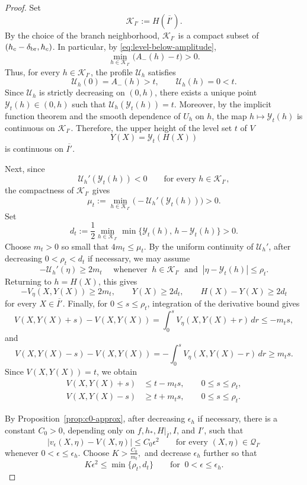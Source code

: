 \documentclass[reqno,12pt]{amsart}
\numberwithin{equation}{section}
\theoremstyle{remark}
\begin{document}
\begin{proof}
Set
$$
\mathcal K_{I'}:=H(\overline{I'}).
$$
By the choice of the branch neighborhood, $\mathcal K_{I'}$ is a compact subset
of $(h_c-\delta_{\rm br},h_c)$. In particular, by
\eqref{eq:level-below-amplitude},
$$
\min_{h\in\mathcal K_{I'}}\bigl(A_-(h)-t\bigr)>0.
$$
Thus, for every $h\in\mathcal K_{I'}$, the profile $\mathcal U_h$ satisfies
$$
\mathcal U_h(0)=A_-(h)>t, \qquad \mathcal U_h(h)=0<t.
$$
Since $\mathcal  U_h$ is strictly decreasing on $(0,h)$, there exists a unique point $\mathcal Y_t(h)\in(0,h)$ such that $\mathcal U_h(\mathcal Y_t(h))=t.$
Moreover, by the implicit function theorem and the smooth dependence of
$U_h$ on $h$, the map $h\mapsto \mathcal Y_t(h)$ is continuous on
$\mathcal K_{I'}$. Therefore, the upper height of the level set $t$ of $V$ 
$$Y(X)=\mathcal Y_t(H(X))$$ 
is continuous on $\overline{I'}$.

Next, since
$$
\mathcal U_h'(\mathcal  Y_t(h))<0
\qquad\text{for every }h\in\mathcal K_{I'},
$$
the compactness of $\mathcal K_{I'}$ gives
$$
\mu_t:= \min_{h\in\mathcal K_{I'}} \bigl(-\mathcal U_h'(\mathcal Y_t(h))\bigr)>0.
$$
Set
$$
d_t:=\frac12
\min_{h\in\mathcal K_{I'}}
\min\{\mathcal Y_t(h),\,h-\mathcal Y_t(h)\}>0.
$$
Choose $m_t>0$ so small that $4m_t\le \mu_t$. 
By the uniform continuity of
$\mathcal U_h'$, after decreasing $0<\rho_t<d_t$ if necessary, we may assume
$$
   -\mathcal U_h'(\eta)\ge 2m_t \quad \text{ 
whenever } \ h\in\mathcal K_{I'} \ \text{ and } \ |\eta-\mathcal Y_t(h)|\le \rho_t.
$$
Returning to $h=H(X)$, this gives
$$
-V_\eta(X,Y(X))\ge 2m_t, \qquad  Y(X)\ge 2d_t,  \qquad
H(X)-Y(X)\ge 2d_t
$$
for every $X\in\overline{I'}$. Finally, for $0\le s\le\rho_t$, integration of
the derivative bound gives
$$
V(X,Y(X)+s)-V(X,Y(X)) = \int_0^s V_\eta(X,Y(X)+r)\,dr  
\le -m_t s,
$$
and
$$
V(X,Y(X)-s)-V(X,Y(X)) = -\int_0^s V_\eta(X,Y(X)-r)\,dr
\ge m_t s.
$$
Since $V(X,Y(X))=t$, we obtain
\begin{equation}\label{eq:crossing-estimate}
\begin{aligned}
V(X,Y(X)+s)&\le t-m_t s,
\qquad 0\le s\le \rho_t,\\
V(X,Y(X)-s)&\ge t+m_t s,
\qquad 0\le s\le \rho_t.
\end{aligned}
\end{equation}


By Proposition~\ref{prop:c0-approx}, after decreasing $\epsilon_h$ if
necessary, there is a constant $C_0>0$, depending only on
$f,h_*,H|_{\overline I},I$, and $I'$, such that
\begin{equation}\label{eq:veps-V-diff}
    |v_\epsilon(X,\eta)-V(X,\eta)|\le C_0\epsilon^2
\qquad\text{for every }(X,\eta)\in\mathcal Q_{I'}
\end{equation}
whenever $0<\epsilon\le\epsilon_h$.  Choose
$K>\frac{C_0}{m_t}, $ and decrease $\epsilon_h$ further so that
\begin{equation}\label{eq:defn-K}
    K\epsilon^2\le \min\{\rho_t,d_t\} \qquad\text{for }\ 0<\epsilon\le\epsilon_h.
\end{equation}
 



\end{proof}
\end{document}
